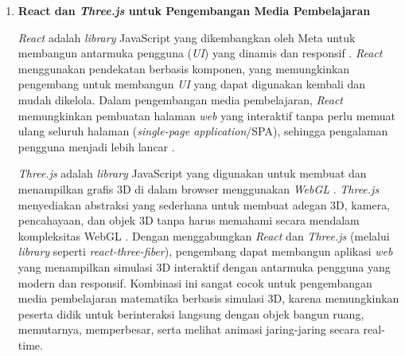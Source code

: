 \begin{enumerate}
    \hspace*{1cm}\textit{Blender} adalah perangkat lunak gratis dan \textit{open-source} untuk pemodelan 3D, animasi, rendering, dan pembuatan game. \textit{Blender} memiliki fitur lengkap yang setara dengan perangkat lunak komersial seperti Maya atau 3ds Max, namun dapat diakses secara gratis oleh siapa saja \citep{blender2023}. Dalam konteks pendidikan, \textit{Blender} telah banyak digunakan untuk membuat model 3D pembelajaran karena fleksibilitasnya dalam menghasilkan objek geometri yang akurat \citep{flavell2011}. Model 3D yang dihasilkan dari \textit{Blender} dapat diekspor ke berbagai format, termasuk \texttt{.glb} atau \texttt{.gltf}, yang kompatibel dengan teknologi \textit{web} seperti \textit{Three.js}. Dengan demikian, integrasi antara \textit{Blender} dan teknologi \textit{web} memungkinkan terciptanya media pembelajaran interaktif berbasis simulasi 3D yang dapat diakses melalui browser tanpa perlu instalasi perangkat lunak tambahan.

    \item \textbf{React dan \textit{Three.js} untuk Pengembangan Media Pembelajaran}
    
    \hspace*{1cm}\textit{React} adalah \textit{library} JavaScript yang dikembangkan oleh Meta untuk membangun antarmuka pengguna (\textit{UI}) yang dinamis dan responsif \citep{react2023}. \textit{React} menggunakan pendekatan berbasis komponen, yang memungkinkan pengembang untuk membangun \textit{UI} yang dapat digunakan kembali dan mudah dikelola. Dalam pengembangan media pembelajaran, \textit{React} memungkinkan pembuatan halaman \textit{web} yang interaktif tanpa perlu memuat ulang seluruh halaman (\textit{single-page application}/SPA), sehingga pengalaman pengguna menjadi lebih lancar \citep{banks2017}.
    
    \hspace*{1cm}\textit{Three.js} adalah \textit{library} JavaScript yang digunakan untuk membuat dan menampilkan grafis 3D di dalam browser menggunakan \textit{WebGL} \citep{threejs2023}. \textit{Three.js} menyediakan abstraksi yang sederhana untuk membuat adegan 3D, kamera, pencahayaan, dan objek 3D tanpa harus memahami secara mendalam kompleksitas WebGL \citep{dirksen2018}. Dengan menggabungkan \textit{React} dan \textit{Three.js} (melalui \textit{library} seperti \textit{react-three-fiber}), pengembang dapat membangun aplikasi \textit{web} yang menampilkan simulasi 3D interaktif dengan antarmuka pengguna yang modern dan responsif. Kombinasi ini sangat cocok untuk pengembangan media pembelajaran matematika berbasis simulasi 3D, karena memungkinkan peserta didik untuk berinteraksi langsung dengan objek bangun ruang, memutarnya, memperbesar, serta melihat animasi jaring-jaring secara real-time.


\end{enumerate}
